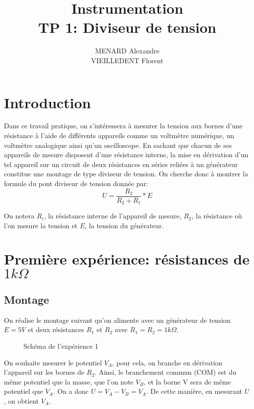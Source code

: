 \documentclass[10pt]{article}
\title{\textbf{Instrumentation} \\ TP 1: Diviseur de tension}
\author{MENARD Alexandre \\ VIEILLEDENT Florent}
\begin{document}
\maketitle

\section*{Introduction}
Dans ce travail pratique, on s'intéressera à mesurer la tension aux bornes d'une résistance à l'aide de différents appareils 
comme un voltmètre numérique, un voltmètre analogique ainsi qu'un oscilloscope. En sachant que chacun de ses appareils de mesure
disposent d'une résistance interne, la mise en dérivation d'un tel appareil sur un circuit de deux résistances en séries reliées à 
un générateur constitue une montage de type diviseur de tension. On cherche donc à montrer la formule du pont diviseur de tension 
donnée par:
\begin{equation}
    U = \frac{R_2}{R_2 + R_1} * E
    \label{eqn:diviseur_tension}
\end{equation}

On notera $R_i$, la résistance interne de l'appareil de mesure, $R_2$, la résistance où l'on mesure la tension et $E$, la tension du 
générateur.

\section{Première expérience: résistances de $1k \Omega$}
\subsection{Montage}

On réalise le montage suivant qu'on alimente avec un générateur de tension $E=5V$ et deux résistances $R_1$ et $R_2$ avec $R_1=R_2=1k\Omega$.

\begin{figure}[!htbp]
    \begin{center}
        \label{fig:schema1}
        \caption{Schéma de l'expérience 1}
    \end{center}
\end{figure}

\newpage

On souhaite mesurer le potentiel $V_A$, pour cela, on branche en dérivation l'appareil sur les bornes de $R_2$. Ainsi, 
le branchement commun (COM) est du même potentiel que la masse, que l'on note $V_B$, et la borne V sera de même potentiel 
que $V_A$. On a donc $U = V_A - V_B = V_A$. De cette manière, en mesurant $U$, on obtient $V_A$.
\end{document}
